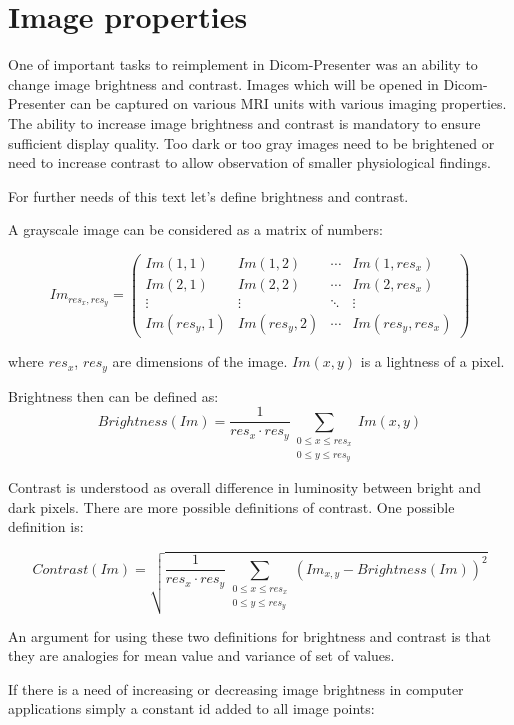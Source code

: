 \section*{Image properties}

One of important tasks to reimplement in Dicom-Presenter was an ability to change image brightness and contrast. Images which will be opened in Dicom-Presenter can be captured on various MRI units with various imaging properties. The ability to increase image brightness and contrast is mandatory to ensure sufficient display quality. Too dark or too gray images need to be brightened or need to increase contrast to allow observation of smaller physiological findings.

For further needs of this text let's define brightness and contrast. 

A grayscale image can be considered as a matrix of numbers: 

\[
 Im_{res_{x},res_{y}} =
 \begin{pmatrix}
  Im(1,1) & Im(1,2) & \cdots & Im(1,res_{x}) \\
  Im(2,1) & Im(2,2) & \cdots & Im(2,res_{x}) \\
  \vdots  & \vdots  & \ddots & \vdots  \\
  Im(res_{y},1) & Im(res_{y},2) & \cdots & Im(res_{y},res_{x})
 \end{pmatrix}
\]

where $ res_{x} $, $res_{y}$ are dimensions of the image. $Im(x,y)$ is a lightness of a pixel.

Brightness then can be defined as:
\[
  Brightness(Im) = \frac{1}{res_{x}  \cdot res_{y}}\sum_{\substack{0 \leq x \leq res_{x} \\ 0 \leq y \leq res_{y}}} Im(x,y)
\]

Contrast is understood as overall difference in luminosity between bright and dark pixels. There are more possible definitions of contrast. One possible definition is:

\[
Contrast(Im) = \sqrt{\frac{1}{res_{x} \cdot res_{y}}\sum_{\substack{ 0 \leq x \leq res_{x} \\ 0 \leq y \leq res_{y} }}(Im_{x,y}-Brightness(Im))^2}
\]

An argument for using these two definitions for brightness and contrast is that they are analogies for mean value and variance of set of values.

If there is a need of increasing or decreasing image brightness in computer applications simply a constant id added to all image points:

